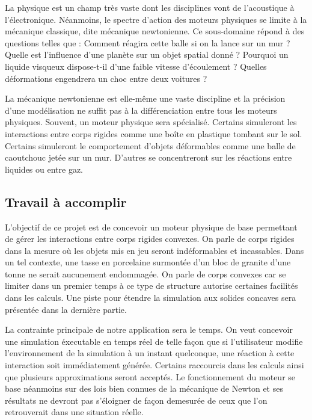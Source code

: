 La physique est un champ très vaste dont les disciplines vont de
l'acoustique à l'électronique. Néanmoins, le spectre d'action des
moteurs physiques se limite à la mécanique classique, dite mécanique
newtonienne. Ce sous-domaine répond à des questions telles que :
Comment réagira cette balle si on la lance sur un mur ? Quelle est
l'influence d'une planète sur un objet spatial donné ? Pourquoi un
liquide visqueux dispose-t-il d'une faible vitesse d'écoulement ?
Quelles déformations engendrera un choc entre deux voitures ?

La mécanique newtonienne est elle-même une vaste discipline et la
précision d'une modélisation ne suffit pas à la différenciation entre
tous les moteurs physiques. Souvent, un moteur physique sera
spécialisé. Certains simuleront les interactions entre corps rigides
comme une boîte en plastique tombant sur le sol. Certains simuleront
le comportement d'objets déformables comme une balle de caoutchouc
jetée sur un mur. D'autres se concentreront sur les réactions entre
liquides ou entre gaz.

\subsection{Travail à accomplir}

L'objectif de ce projet est de concevoir un moteur physique de base
permettant de gérer les interactions entre corps rigides convexes. On
parle de corps rigides dans la mesure o\`u les objets mis en jeu
seront indéformables et incassables. Dans un tel contexte, une tasse
en porcelaine surmontée d'un bloc de granite d'une tonne ne serait
aucunement endommagée. On parle de corps convexes car se limiter dans
un premier temps à ce type de structure autorise certaines facilités
dans les calculs. Une piste pour étendre la simulation aux solides
concaves sera présentée dans la dernière partie.

La contrainte principale de notre application sera le temps. On veut
concevoir une simulation éxecutable en temps réel de telle façon que
si l'utilisateur modifie l'environnement de la simulation à un instant
quelconque, une réaction à cette interaction soit immédiatement
générée. Certains raccourcis dans les calculs ainsi que plusieurs
approximations seront acceptés. Le fonctionnement du moteur se base
néanmoins sur des lois bien connues de la mécanique de Newton et ses
résultats ne devront pas s'éloigner de façon demesurée de ceux que
l'on retrouverait dans une situation réelle.

